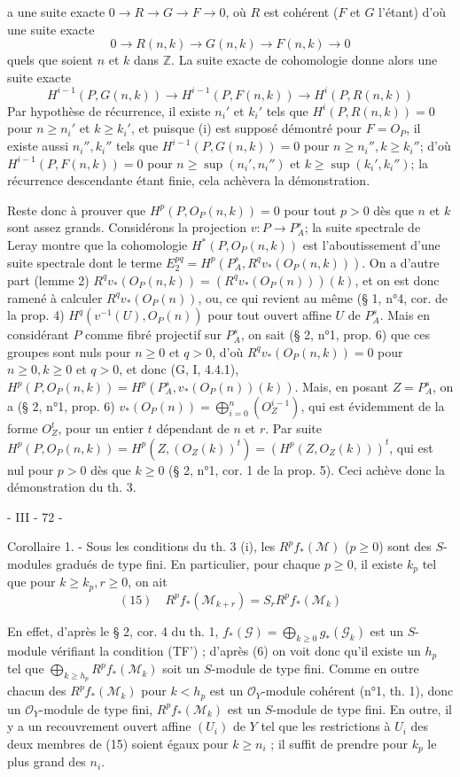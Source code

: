 a une suite exacte $0 \to R \to G \to F \to 0$, où $R$ est cohérent ($F$ et $G$ l'étant) d'où une suite exacte
$$0 \to R(n,k) \to G(n,k) \to F(n,k) \to 0$$
quels que soient $n$ et $k$ dans $\mathbb{Z}$. La suite exacte de cohomologie donne alors une suite exacte
$$H^{i-1}(P, G(n,k)) \to H^{i-1}(P, F(n,k)) \to H^i(P, R(n,k))$$
Par hypothèse de récurrence, il existe $n_i'$ et $k_i'$ tels que $H^i(P, R(n,k)) = 0$ pour $n \ge n_i'$ et $k \ge k_i'$, et puisque (i) est supposé démontré pour $F=O_P$, il existe aussi $n_i'', k_i''$ tels que $H^{i-1}(P, G(n,k)) = 0$ pour $n \ge n_i'', k \ge k_i''$; d'où $H^{i-1}(P, F(n,k)) = 0$ pour $n \ge \sup(n_i', n_i'')$ et $k \ge \sup(k_i', k_i'')$; la récurrence descendante étant finie, cela achèvera la démonstration.

Reste donc à prouver que $H^p(P, O_P(n,k)) = 0$ pour tout $p > 0$ dès que $n$ et $k$ sont assez grands. Considérons la projection $v : P \to P_A^s$; la suite spectrale de Leray montre que la cohomologie $H^*(P, O_P(n,k))$ est l'aboutissement d'une suite spectrale dont le terme $E_2^{pq} = H^p(P_A^s, R^q v_* (O_P(n,k)))$. On a d'autre part (lemme 2) $R^q v_* (O_P(n,k)) = (R^q v_* (O_P(n))) (k)$, et on est donc ramené à calculer $R^q v_* (O_P(n))$, ou, ce qui revient au même (§ 1, n°4, cor. de la prop. 4) $H^q(v^{-1}(U), O_P(n))$ pour tout ouvert affine $U$ de $P_A^s$. Mais en considérant $P$ comme fibré projectif sur $P_A^s$, on sait (§ 2, n°1, prop. 6) que ces groupes sont nuls pour $n \ge 0$ et $q > 0$, d'où $R^q v_* (O_P(n,k)) = 0$ pour $n \ge 0, k \ge 0$ et $q > 0$, et donc (G, I, 4.4.1), $H^p(P, O_P(n,k)) = H^p(P_A^s, v_* (O_P(n))(k))$. Mais, en posant $Z = P_A^s$, on a (§ 2, n°1, prop. 6) $v_* (O_P(n)) = \bigoplus_{i=0}^n (O_Z^{i-1})$, qui est évidemment de la forme $O_Z^t$, pour un entier $t$ dépendant de $n$ et $r$. Par suite $H^p(P, O_P(n,k)) = H^p(Z, (O_Z(k))^t) = (H^p(Z, O_Z(k)))^t$, qui est nul pour $p>0$ dès que $k \ge 0$ (§ 2, n°1, cor. 1 de la prop. 5). Ceci achève donc la démonstration du th. 3.

\newpage


- III - 72 -

Corollaire 1. - Sous les conditions du th. 3 (i), les $R^p f_* (\mathcal{M})$ ($p \ge 0$) sont des $S$-modules gradués de type fini. En particulier, pour chaque $p \ge 0$, il existe $k_p$ tel que pour $k \ge k_p, r \ge 0$, on ait
$$(15) \quad R^p f_* (\mathcal{M}_{k+r}) = S_r R^p f_* (\mathcal{M}_k)$$

En effet, d'après le § 2, cor. 4 du th. 1, $f_* (\mathcal{G}) = \bigoplus_{k \ge 0} g_* (\mathcal{G}_k)$ est un $S$-module vérifiant la condition (TF') ; d'après (6) on voit donc qu'il existe un $h_p$ tel que $\bigoplus_{k \ge h_p} R^p f_* (\mathcal{M}_k)$ soit un $S$-module de type fini. Comme en outre chacun des $R^p f_* (\mathcal{M}_k)$ pour $k < h_p$ est un $\mathcal{O}_Y$-module cohérent (n°1, th. 1), donc un $\mathcal{O}_Y$-module de type fini, $R^p f_* (\mathcal{M}_k)$ est un $S$-module de type fini. En outre, il y a un recouvrement ouvert affine $(U_i)$ de $Y$ tel que les restrictions à $U_i$ des deux membres de (15) soient égaux pour $k \ge n_i$ ; il suffit de prendre pour $k_p$ le plus grand des $n_i$.


